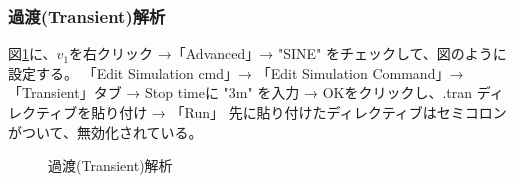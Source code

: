 \subsubsection{過渡(Transient)解析}
    図\ref{kato}に、$v_1$を右クリック →「Advanced」→ "SINE" をチェックして、図のように設定する。
    「Edit Simulation cmd」→ 「Edit Simulation Command」→ 「Transient」タブ → Stop timeに "3m" を入力 → OKをクリックし、.tran ディレクティブを貼り付け → 「Run」
先に貼り付けたディレクティブはセミコロンがついて、無効化されている。
    \begin{figure}[htb]
      \begin{center}
      \caption{過渡(Transient)解析}
      \label{kato}
      \end{center}
    \end{figure}
